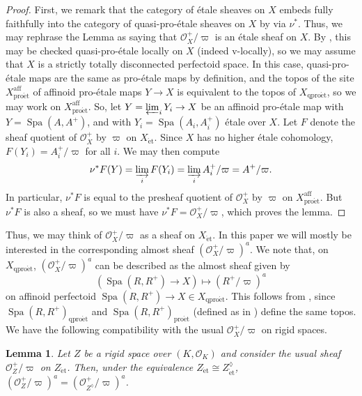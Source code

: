 \documentclass{amsart}
\newtheorem{lemma}[subsubsection]{Lemma}
\theoremstyle{remark}
\numberwithin{equation}{subsection}
\newcommand{\cO}{{\mathcal O}}
\DeclareMathOperator{\Spa}{Spa}
\newcommand{\et}{\mathrm{\acute{e}t}}
\newcommand{\proet}{\mathrm{pro\acute{e}t}}
\newcommand{\qp}{\mathrm{qpro\acute{e}t}}
\renewcommand{\(}{\left(}
\renewcommand{\)}{\right)}
\begin{document}
\begin{proof}
First, we remark that the category of \'etale sheaves on $X$ embeds fully faithfully into the category of quasi-pro-\'etale sheaves on $X$ by \cite[Proposition 14.8]{diamonds} via $\nu^{\ast}$. Thus, we may rephrase the Lemma as saying that $\cO_{X}^{+}/\varpi$ is an \'etale sheaf on $X$. By \cite[Theorem 14.12(ii)]{diamonds}, this may be checked quasi-pro-\'etale locally on $X$ (indeed v-locally), so we may assume that $X$ is a strictly totally disconnected perfectoid space. In this case, quasi-pro-\'etale maps are the same as pro-\'etale maps by definition, and the topos of the site $X_{\proet}^{\mathrm{aff}}$ of affinoid pro-\'etale maps $Y \to X$ is equivalent to the topos of $X_{\qp}$, so we may work on $X_{\proet}^{\mathrm{aff}}$. So, let $Y=\varprojlim_{i}Y_{i} \to X$ be an affinoid pro-\'etale map with $Y=\Spa(A,A^{+})$, and with $Y_{i}=\Spa(A_{i},A_{i}^{+})$ \'etale over $X$. Let $F$ denote the sheaf quotient of $\cO_X^+$ by $\varpi$ on $X_\et$. Since $X$ has no higher \'etale cohomology, $F(Y_i)=A_i^+/\varpi$ for all $i$. We may then compute
\[
\nu^\ast F(Y) = \varinjlim_i F(Y_i) = \varinjlim_i A_i^+/\varpi = A^+/\varpi.
\]   
In particular, $\nu^\ast F$ is equal to the presheaf quotient of $\cO_X^+$ by $\varpi$ on $X_{\proet}^{\mathrm{aff}}$. But $\nu^\ast F$ is also a sheaf, so we must have $\nu^\ast F= \cO_X^+/\varpi$, which proves the lemma.
\end{proof}

Thus, we may think of $\cO_{X}^{+}/\varpi$ as a sheaf on $X_{\et}$. In this paper we will mostly be interested in the corresponding almost sheaf $(\cO^{+}_{X}/\varpi)^{a}$. We note that, on $X_{\qp}$, $(\cO^{+}_{X}/\varpi)^{a}$ can be described as the almost sheaf given by
$$ \left( \Spa(R,R^{+}) \to X \right) \mapsto (R^{+}/\varpi)^{a} $$
on affinoid perfectoid $\Spa(R,R^{+}) \to X \in X_{\qp}$. This follows from \cite[Proposition 8.5(iii)]{diamonds}, since $\Spa(R,R^{+})_{\qp}$ and $\Spa(R,R^{+})_{\proet}$ (defined as in \cite[Definition 8.1(ii)]{diamonds}) define the same topos. We have the following compatibility with the usual $\cO_{X}^{+}/\varpi$ on rigid spaces.

\begin{lemma}\label{compatibility of structure sheaves}
Let $Z$ be a rigid space over $(K,\cO_{K})$ and consider the usual sheaf $\cO_{Z}^{+}/\varpi$ on $Z_{\et}$. Then, under the equivalence $Z_{\et}\cong Z_{\et}^{\lozenge}$, $(\cO_{Z}^{+}/\varpi)^{a}=(\cO_{Z^{\lozenge}}^{+}/\varpi)^{a}$.
\end{lemma}
\end{document}

